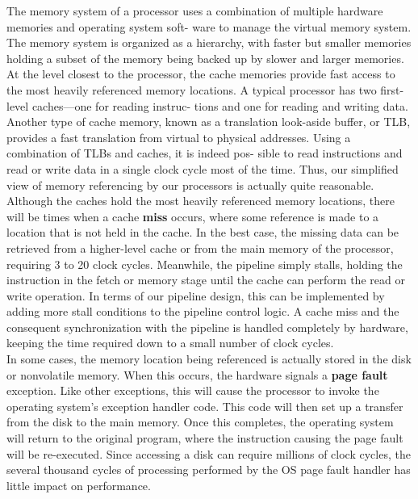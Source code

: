 \documentclass[11pt]{article}
\begin{document}
\begin{enumerate}
The memory system of a processor uses a combination of multiple hardware memories and operating system soft- ware to manage the virtual memory system. The memory system is organized as a hierarchy, with faster but smaller memories holding a subset of the memory being backed up by slower and larger memories. At the level closest to the processor, the cache memories provide fast access to the most heavily referenced memory locations. A typical processor has two first-level caches—one for reading instruc- tions and one for reading and writing data. Another type of cache memory, known as a translation look-aside buffer, or TLB, provides a fast translation from virtual to physical addresses. Using a combination of TLBs and caches, it is indeed pos- sible to read instructions and read or write data in a single clock cycle most of the time. Thus, our simplified view of memory referencing by our processors is actually quite reasonable.\\

Although the caches hold the most heavily referenced memory locations, there will be times when a cache \textbf{miss} occurs, where some reference is made to a location that is not held in the cache. In the best case, the missing data can be retrieved from a higher-level cache or from the main memory of the processor, requiring 3 to 20 clock cycles. Meanwhile, the pipeline simply stalls, holding the instruction in the fetch or memory stage until the cache can perform the read or write operation. In terms of our pipeline design, this can be implemented by adding more stall conditions to the pipeline control logic. A cache miss and the consequent synchronization with the pipeline is handled completely by hardware, keeping the time required down to a small number of clock cycles.\\

In some cases, the memory location being referenced is actually stored in the disk or nonvolatile memory. When this occurs, the hardware signals a \textbf{page fault} exception. Like other exceptions, this will cause the processor to invoke the operating system’s exception handler code. This code will then set up a transfer from the disk to the main memory. Once this completes, the operating system will return to the original program, where the instruction causing the page fault will be re-executed. Since accessing a disk can require millions of clock cycles, the several thousand cycles of processing performed by the OS page fault handler has little impact on performance.\\
\end{enumerate}
\end{document}
